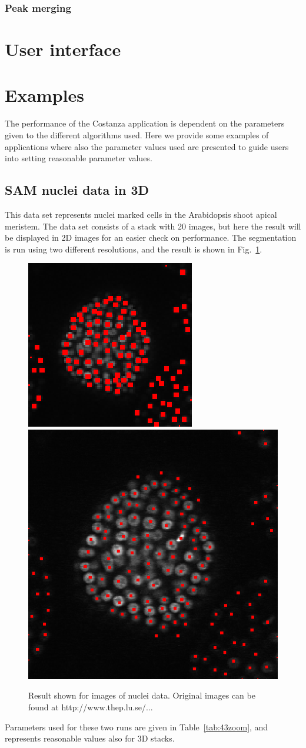 \documentclass[a4paper,12pt]{article}
\begin{document}
\subsubsection{Peak merging}

\section{User interface}

\section{Examples}

The performance of the Costanza application is dependent on the
parameters given to the different algorithms used. Here we provide
some examples of applications where also the parameter values used are
presented to guide users into setting reasonable parameter values.

\subsection{SAM nuclei data in 3D}

This data set represents nuclei marked cells in the Arabidopsis shoot apical
meristem. The data set consists of a stack with 20 images, but here the result
will be displayed in 2D images for an easier check on performance. The
segmentation is run using two different resolutions, and the result is shown
in Fig.~\ref{fig:43zoom}.

\begin{figure}[h!]
\begin{center}
\includegraphics[width=0.25\columnwidth]{figures/43smallzoomCenters.eps}
\hspace{0.20\columnwidth}
\includegraphics[width=0.5\columnwidth]{figures/43zoomCenters.eps}
\caption{Result shown for images of nuclei data. Original images can be found
	at http://www.thep.lu.se/...}
\label{fig:43zoom}
\end{center}
\end{figure}
%
Parameters used for these two runs are given in Table~\ref{tab:43zoom}, and
represents reasonable values also for 3D stacks.
\end{document}
